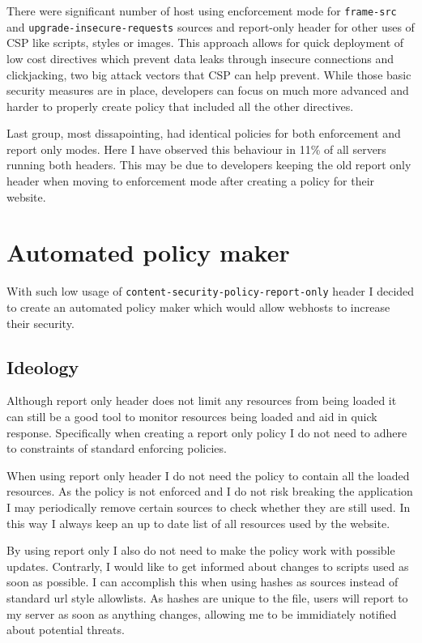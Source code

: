 There were significant number of host using encforcement mode for \texttt{frame-src} and \texttt{upgrade-insecure-requests} sources and report-only header for other uses of CSP like scripts, styles or images.
This approach allows for quick deployment of low cost directives which prevent data leaks through insecure connections and clickjacking, two big attack vectors that CSP can help prevent.
While those basic security measures are in place, developers can focus on much more advanced and harder to properly create policy that included all the other directives.

Last group, most dissapointing, had identical policies for both enforcement and report only modes.
Here I have observed this behaviour in 11\% of all servers running both headers.
This may be due to developers keeping the old report only header when moving to enforcement mode after creating a policy for their website.

\section{Automated policy maker}

With such low usage of \texttt{content-security-policy-report-only} header I decided to create an automated policy maker which would allow webhosts to increase their security.

\subsection{Ideology}

Although report only header does not limit any resources from being loaded it can still be a good tool to monitor resources being loaded and aid in quick response.
Specifically when creating a report only policy I do not need to adhere to constraints of standard enforcing policies.


When using report only header I do not need the policy to contain all the loaded resources.
As the policy is not enforced and I do not risk breaking the application I may periodically remove certain sources to check whether they are still used.
In this way I always keep an up to date list of all resources used by the website.

By using report only I also do not need to make the policy work with possible updates.
Contrarly, I would like to get informed about changes to scripts used as soon as possible.
I can accomplish this when using hashes as sources instead of standard url style allowlists.
As hashes are unique to the file, users will report to my server as soon as anything changes, allowing me to be immidiately notified about potential threats.

